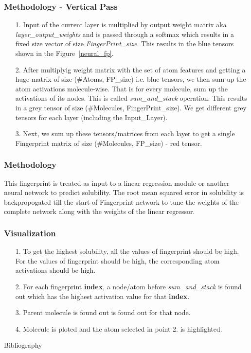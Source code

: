 \documentclass{beamer}
\begin{document}
\begin{frame}
\frametitle{Methodology - Vertical Pass}
\begin{enumerate}
\item[1.]  Input of the current layer is multiplied by output weight matrix aka \textit{layer\_output\_weights} and is passed through a softmax which results in a fixed size vector of size \textit{FingerPrint\_size}. This results in the blue tensors shown in the Figure~\ref{neural_fp}.

\item[2.] After multiplyig weight matrix with the set of atom features and getting a huge matrix of size (\#Atoms, FP\_size) i.e. blue tensors, we then sum up the atom activations molecule-wise. That is for every molecule, sum up the activations of its nodes. This is called \textit{sum\_and\_stack} operation. This results in a grey tensor of size (\#Molecules, FingerPrint\_size). We get different grey tensors for each layer (including the Input\_Layer).

\item[3.] Next, we sum up these tensors/matrices from each layer to get a single Fingerprint matrix of size (\#Molecules, FP\_size) - red tensor.
\end{enumerate}
\end{frame}


\begin{frame}
\frametitle{Methodology }

This fingerprint is treated as input to a linear regression module or another neural network to predict solubility. The root mean squared error in solubility is backpropogated till the start of Fingerprint network to tune the weights of the complete network along with the weights of the linear regressor.

\end{frame}


\begin{frame}
\frametitle{Visualization}
\begin{enumerate}

\item[1.] To get the highest solubility, all the values of fingerprint should be high. For the values of fingerprint should be high, the corresponding atom activations should be high.
\item[2.] For each fingerprint \textbf{index}, a node/atom before \textit{sum\_and\_stack} is found out which has the highest activation value for that \textbf{index}.
\item[3.] Parent molecule is found out is found out for that node.
\item[4.] Molecule is ploted and the atom selected in point 2. is highlighted. 


\end{enumerate}
\end{frame}

\begin{frame}
Bibliography



\end{frame}
\end{document}
